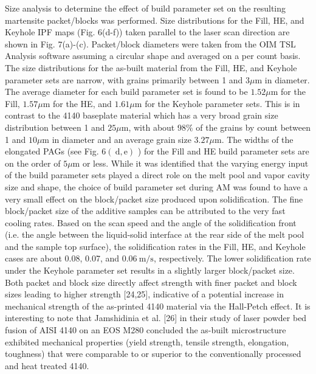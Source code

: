 \documentclass[10pt]{article}
\begin{document}
Size analysis to determine the effect of build parameter set on the resulting martensite packet/blocks was performed. Size distributions for the Fill, HE, and Keyhole IPF maps (Fig. 6(d-f)) taken parallel to the laser scan direction are shown in Fig. 7(a)-(c). Packet/block diameters were taken from the OIM TSL Analysis software assuming a circular shape and averaged on a per count basis. The size distributions for the as-built material from the Fill, HE, and Keyhole parameter sets are narrow, with grains primarily between 1 and $3 \mu \mathrm{m}$ in diameter. The average diameter for each build parameter set is found to be $1.52 \mu \mathrm{m}$ for the Fill, $1.57 \mu \mathrm{m}$ for the HE, and $1.61 \mu \mathrm{m}$ for the Keyhole parameter sets. This is in contrast to the 4140 baseplate material which has a very broad grain size distribution between 1 and $25 \mu \mathrm{m}$, with about $98 \%$ of the grains by count between 1 and $10 \mu \mathrm{m}$ in diameter and an average grain size $3.27 \mu \mathrm{m}$. The widths of the elongated PAGs (see Fig. $6(\mathrm{~d}, \mathrm{e})$ ) for the Fill and HE build parameter sets are on the order of $5 \mu \mathrm{m}$ or less. While it was identified that the varying energy input of the build parameter sets played a direct role on the melt pool and vapor cavity size and shape, the choice of build parameter set during AM was found to have a very small effect on the block/packet size produced upon solidification. The fine block/packet size of the additive samples can be attributed to the very fast cooling rates. Based on the scan speed and the angle of the solidification front (i.e. the angle between the liquid-solid interface at the rear side of the melt pool and the sample top surface), the solidification rates in the Fill, HE, and Keyhole cases are about 0.08, 0.07, and $0.06 \mathrm{~m} / \mathrm{s}$, respectively. The lower solidification rate under the Keyhole parameter set results in a slightly larger block/packet size. Both packet and block size directly affect strength with finer packet and block sizes leading to higher strength [24,25], indicative of a potential increase in mechanical strength of the as-printed 4140 material via the Hall-Petch effect. It is interesting to note that Jamshidinia et al. [26] in their study of laser powder bed fusion of AISI 4140 on an EOS M280 concluded the as-built microstructure exhibited mechanical properties (yield strength, tensile strength, elongation, toughness) that were comparable to or superior to the conventionally processed and heat treated 4140.
\end{document}
